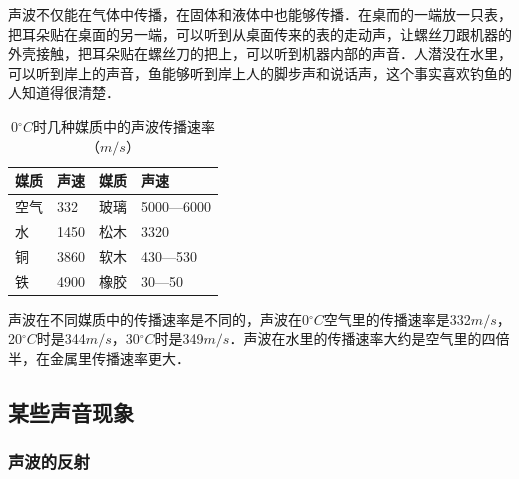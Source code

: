 声波不仅能在气体中传播，在固体和液体中也能够传播．在桌而的一端放一只表，把耳朵贴在桌面的另一端，可以听到从桌面传来的表的走动声，让螺丝刀跟机器的外壳接触，把耳朵贴在螺丝刀的把上，可以听到机器内部的声音．人潜没在水里，可以听到岸上的声音，鱼能够听到岸上人的脚步声和说话声，这个事实喜欢钓鱼的人知道得很清楚．

\begin{table}[H]
    \centering
    \caption{0$^\circ { C}$时几种媒质中的声波传播速率（${ m/s}$）}
    \begin{tabularx}{\textwidth}{MMMM}
        \toprule[1.5pt]
        媒质 & 声速   & 媒质 & 声速        \\
        \midrule
        空气 & 332  & 玻璃 & 5000—6000 \\
        水  & 1450 & 松木 & 3320      \\
        铜  & 3860 & 软木 & 430—530   \\
        铁  & 4900 & 橡胶 & 30—50     \\
        \bottomrule[1.5pt]
    \end{tabularx}
\end{table}

声波在不同媒质中的传播速率是不同的，声波在0$^\circ { C}$空气里的传播速率是332$\si{m/s}$，20$^\circ { C}$时是344$\si{m/s}$，30$^\circ { C}$时是349$\si{m/s}$．声波在水里的传播速率大约是空气里的四倍半，在金属里传播速率更大．

\subsection{某些声音现象}
\subsubsection{声波的反射}

